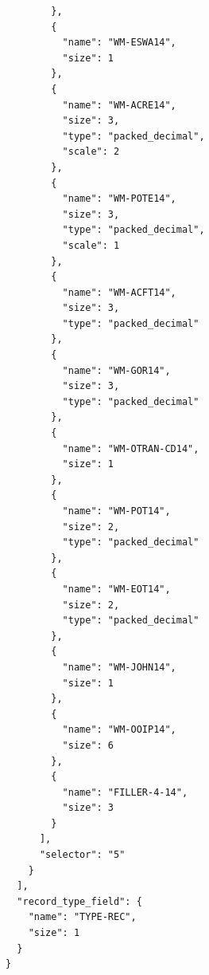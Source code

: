 \documentclass[11pt,a4paper]{article}
\begin{document}
\begin{verbatim}
        },
        {
          "name": "WM-ESWA14",
          "size": 1
        },
        {
          "name": "WM-ACRE14",
          "size": 3,
          "type": "packed_decimal",
          "scale": 2
        },
        {
          "name": "WM-POTE14",
          "size": 3,
          "type": "packed_decimal",
          "scale": 1
        },
        {
          "name": "WM-ACFT14",
          "size": 3,
          "type": "packed_decimal"
        },
        {
          "name": "WM-GOR14",
          "size": 3,
          "type": "packed_decimal"
        },
        {
          "name": "WM-OTRAN-CD14",
          "size": 1
        },
        {
          "name": "WM-POT14",
          "size": 2,
          "type": "packed_decimal"
        },
        {
          "name": "WM-EOT14",
          "size": 2,
          "type": "packed_decimal"
        },
        {
          "name": "WM-JOHN14",
          "size": 1
        },
        {
          "name": "WM-OOIP14",
          "size": 6
        },
        {
          "name": "FILLER-4-14",
          "size": 3
        }
      ],
      "selector": "5"
    }
  ],
  "record_type_field": {
    "name": "TYPE-REC",
    "size": 1
  }
}
\end{verbatim}
\end{document}
